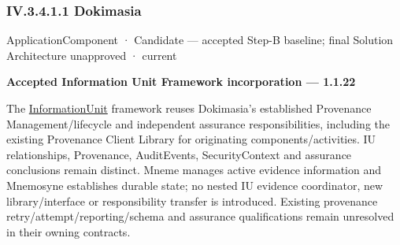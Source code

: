 \subsubsection*{IV.3.4.1.1 Dokimasia}
\label{navigation:IV.3.4.1.1}

\label{element:d739c75dffe2453081735710b285f03b}
{\small ApplicationComponent · Candidate — accepted Step-B baseline; final Solution Architecture unapproved · current}\par

\par\medskip\textbf{Accepted Information Unit Framework incorporation — 1.1.22}\par


The \hyperref[element:74ec609de1ae498fbf9d13e4ef8c6cbe]{InformationUnit} framework reuses Dokimasia's established Provenance Management/lifecycle and independent assurance responsibilities, including the existing Provenance Client Library for originating components/activities. IU relationships, Provenance, AuditEvents, SecurityContext and assurance conclusions remain distinct. Mneme manages active evidence information and Mnemosyne establishes durable state; no nested IU evidence coordinator, new library/interface or responsibility transfer is introduced. Existing provenance retry/attempt/reporting/schema and assurance qualifications remain unresolved in their owning contracts.



